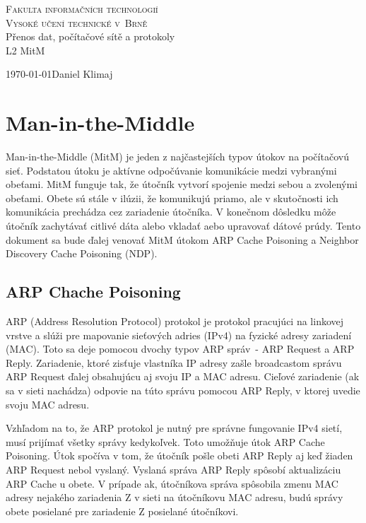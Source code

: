 \documentclass[a4paper,11pt]{article}
\begin{document}
\begin{titlepage}

\begin{center}
\Huge
\textsc{Fakulta informačních technologií \\
Vysoké učení technické v~Brně} \\
\LARGE
Přenos dat, počítačové sítě a protokoly \\
\Huge L2 MitM
\end{center}
{\LARGE \today \hfill Daniel Klimaj}
\end{titlepage}

\tableofcontents
\newpage

\section{Man-in-the-Middle}

Man-in-the-Middle (MitM) je jeden z najčastejších typov útokov na počítačovú sieť. Podstatou útoku je aktívne odpočúvanie komunikácie medzi vybranými obeťami. MitM funguje tak, že útočník vytvorí spojenie medzi sebou a zvolenými obeťami. Obete sú stále v ilúzii, že komunikujú priamo, ale v skutočnosti ich komunikácia prechádza cez zariadenie útočníka. V konečnom dôsledku môže útočník zachytávať citlivé dáta alebo vkladať aebo upravovať dátové prúdy\cite{Arpp}. Tento dokument sa bude ďalej venovať MitM útokom ARP Cache Poisoning a Neighbor Discovery Cache Poisoning (NDP).

\subsection{ARP Chache Poisoning}

ARP (Address Resolution Protocol) protokol je protokol pracujúci na linkovej vrstve a slúži pre mapovanie sieťových adries (IPv4) na fyzické adresy zariadení (MAC). Toto sa deje pomocou dvochy typov ARP správ~- ARP Request a ARP Reply. Zariadenie, ktoré zisťuje vlastníka IP adresy zašle broadcastom správu ARP Request ďalej obsahujúcu aj svoju IP a MAC adresu. Cieľové zariadenie (ak sa v sieti nachádza) odpovie na túto správu pomocou ARP Reply, v ktorej uvedie svoju MAC adresu\cite{Arpp}.

Vzhľadom na to, že ARP protokol je nutný pre správne fungovanie IPv4 sietí, musí prijímať všetky správy kedykoľvek. Toto umožňuje útok ARP Cache Poisoning. Útok spočíva v tom, že útočník pošle obeti ARP Reply aj keď žiaden ARP Request nebol vyslaný. Vyslaná správa ARP Reply spôsobí aktualizáciu ARP Cache u obete. V prípade ak, útočníkova správa spôsobila zmenu MAC adresy nejakého zariadenia Z v sieti na útočníkovu MAC adresu, budú správy obete posielané pre zariadenie Z posielané útočníkovi.
\end{document}
